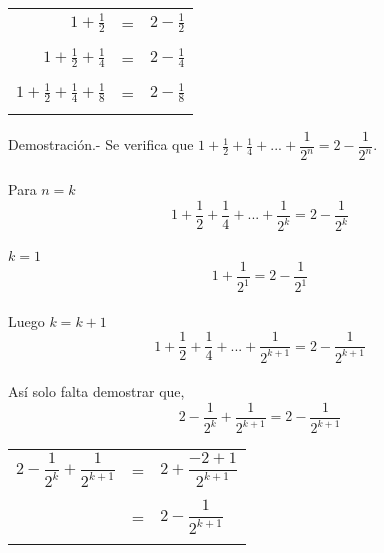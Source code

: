 \begin{enumerate}[\bfseries  1.]
\begin{center}
\begin{tabular}{r c l}
$1+\frac{1}{2}$&=&$2-\frac{1}{2}$\\\\
$1+\frac{1}{2}+\frac{1}{4}$&=&$2-\frac{1}{4}$\\\\
$1+\frac{1}{2}+\frac{1}{4}+\frac{1}{8}$&=&$2-\frac{1}{8}$\\\\
\end{tabular}
\end{center}
Demostración.- \; Se verifica que $1+\frac{1}{2}+\frac{1}{4}+...+\dfrac{1}{2^n}=2-\dfrac{1}{2^n}$.\\\\
Para $n=k$ $$1+\frac{1}{2}+\frac{1}{4}+...+\dfrac{1}{2^k}=2-\dfrac{1}{2^k}$$\\
$k=1$ $$1+\dfrac{1}{2^1}=2-\dfrac{1}{2^1}$$\\
Luego $k=k+1$ $$1+\frac{1}{2}+\frac{1}{4}+...+\dfrac{1}{2^{k+1}}=2-\dfrac{1}{2^{k+1}}$$\\
Así solo falta demostrar que, $$2-\dfrac{1}{2^k}+\dfrac{1}{2^{k+1}}=2-\dfrac{1}{2^{k+1}}$$
\begin{center}
\begin{tabular}{r c l}
$2-\dfrac{1}{2^k}+\dfrac{1}{2^{k+1}}$&=&$2+\dfrac{-2+1}{2^{k+1}}$\\\\
&=&$2-\dfrac{1}{2^{k+1}}$\\\\
\end{tabular}
\end{center}


\end{enumerate}
